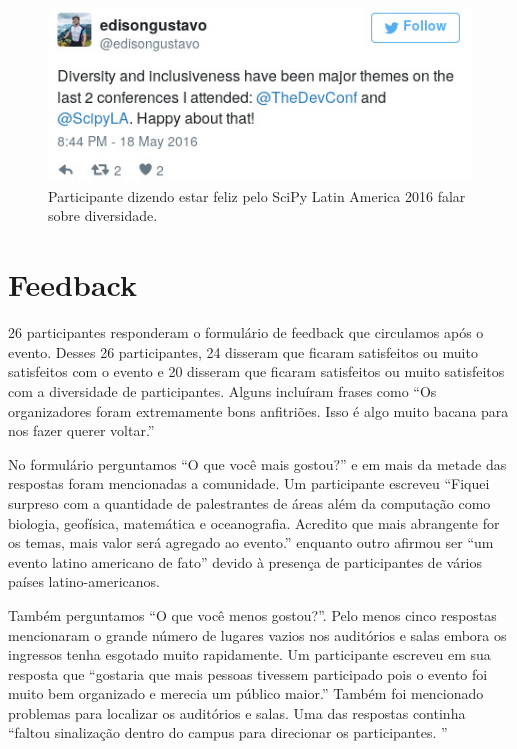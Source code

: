 \documentclass[12pt]{article}
\begin{document}
\begin{figure}[!htb]
\center
\includegraphics[height=.3\textheight]{tweet-diversidade.jpg}
\caption{Participante dizendo estar feliz pelo SciPy Latin America 2016 falar
sobre diversidade.}
\end{figure}

\clearpage
\newpage

\section*{Feedback}

26 participantes responderam o formulário de feedback que circulamos após o
evento. Desses 26 participantes, 24 disseram que ficaram satisfeitos ou muito
satisfeitos com o evento e 20 disseram que ficaram satisfeitos ou muito
satisfeitos com a diversidade de participantes. Alguns incluíram frases como
``Os organizadores foram extremamente bons anfitriões. Isso é algo muito bacana
para nos fazer querer voltar.''

No formulário perguntamos ``O que você mais gostou?'' e em mais da metade das
respostas foram mencionadas a comunidade. Um participante escreveu ``Fiquei
surpreso com a quantidade de palestrantes de áreas além da computação como
biologia, geofísica, matemática e oceanografia. Acredito que mais abrangente for
os temas, mais valor será agregado ao evento.'' enquanto outro afirmou ser
``um evento latino americano de fato'' devido à presença de participantes de
vários países latino-americanos.

Também perguntamos ``O que você menos gostou?''. Pelo menos cinco respostas
mencionaram o grande número de lugares vazios nos auditórios e salas embora
os ingressos tenha esgotado muito rapidamente. Um participante escreveu em sua
resposta que ``gostaria que mais pessoas tivessem participado pois o evento foi
muito bem organizado e merecia um público maior.'' Também foi mencionado
problemas para localizar os auditórios e salas. Uma das respostas continha
``faltou sinalização dentro do campus para direcionar os participantes. ''
\end{document}
